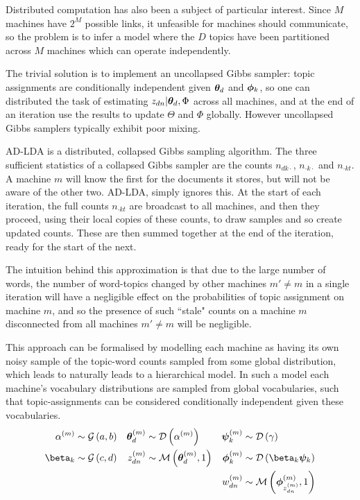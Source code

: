 Distributed computation has also been a subject of particular interest. Since $M$ machines have $2^M$ possible links, it unfeasible for machines should communicate, so the problem is to infer a model where the $D$ topics have been partitioned across $M$ machines which can operate independently.

The trivial solution is to implement an uncollapsed Gibbs sampler: topic assignments are conditionally independent given ${ \bm \theta_d }$ and ${ \bm \phi_k }$, so one can distributed the task of estimating $z_{dn} | { \bm \theta_d }, \Phi$ across all machines, and at the end of an iteration use the results to update $\Theta$ and $\Phi$ globally. However uncollapsed Gibbs samplers typically exhibit poor mixing.

AD-LDA\cite{Newman2009} is a distributed, collapsed Gibbs sampling algorithm. The three sufficient statistics of a collapsed Gibbs sampler are the counts $n_{dk\cdot}$, $n_{\cdot k \cdot}$ and $n_{\cdot k t}$. A machine $m$ will know the first for the documents it stores, but will not be aware of the other two. AD-LDA, simply ignores this. At the start of each iteration, the full counts $n_{\cdot kt}$ are broadcast to all machines, and then they proceed, using their local copies of these counts, to draw samples and so create updated counts. These are then summed together at the end of the iteration, ready for the start of the next. 

The intuition behind this approximation is that due to the large number of words, the number of word-topics changed by other machines $m' \neq m$ in a single iteration will have a negligible effect on the probabilities of topic assignment on machine $m$, and so the presence of such ``stale" counts on a machine $m$ disconnected from all machines $m' \neq m$ will be negligible.

This approach can be formalised by modelling each machine as having its own noisy sample of the topic-word counts sampled from some global distribution, which leads to naturally leads to a hierarchical model. In such a model each machine's vocabulary distributions are sampled from global vocabularies, such that topic-assignments can be considered conditionally independent given these vocabularies.
\begin{align}
\alpha^{(m)} & \sim \gam{a}{b} &
\vv{\theta}_d^{(m)} & \sim \dir{\alpha^{(m)}} &
\vv{\psi}_k^{(m)} & \sim \dir{\gamma} \\
\beta_k & \sim \gam{c}{d} &
z_{dn}^{(m)} & \sim \muln{\vv{\theta}_d^{(m)}}{1} &
\vv{\phi}_k^{(m)} & \sim \dir{\beta_k \vv{\psi}_k} \\
& &
& &
w_{dn}^{(m)} & \sim \muln{\vv{\phi}_{z_{dn}^{(m)}}^{(m)}}{1}
\end{align}

